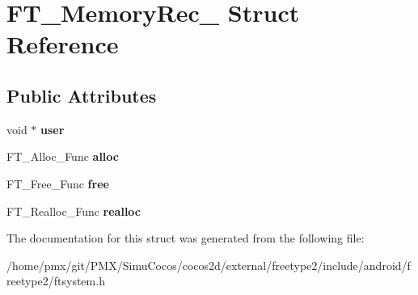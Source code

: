 \hypertarget{structFT__MemoryRec__}{}\section{F\+T\+\_\+\+Memory\+Rec\+\_\+ Struct Reference}
\label{structFT__MemoryRec__}
\subsection*{Public Attributes}
\begin{DoxyCompactItemize}
\item 
\mbox{\label{structFT__MemoryRec___a8fec81d80999f64392ca0b8d0b5bffbf}} 
void $\ast$ {\bfseries user}
\item 
\mbox{\label{structFT__MemoryRec___a2269eada6afbb008fe5c73707145410c}} 
F\+T\+\_\+\+Alloc\+\_\+\+Func {\bfseries alloc}
\item 
\mbox{\label{structFT__MemoryRec___a83ab2422bd9265d8731b9e5e368ba240}} 
F\+T\+\_\+\+Free\+\_\+\+Func {\bfseries free}
\item 
\mbox{\label{structFT__MemoryRec___a5ce3424cc72e898fe973ffeabe44a95c}} 
F\+T\+\_\+\+Realloc\+\_\+\+Func {\bfseries realloc}
\end{DoxyCompactItemize}


The documentation for this struct was generated from the following file\+:\begin{DoxyCompactItemize}
\item 
/home/pmx/git/\+P\+M\+X/\+Simu\+Cocos/cocos2d/external/freetype2/include/android/freetype2/ftsystem.\+h\end{DoxyCompactItemize}
